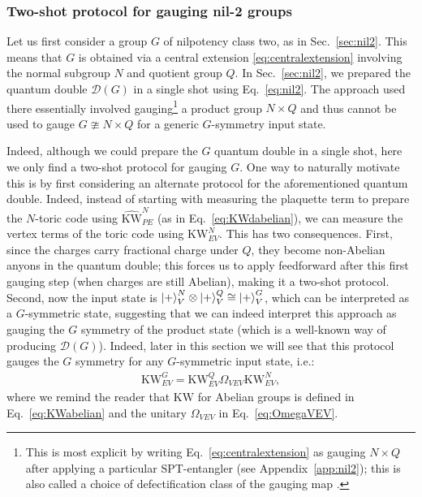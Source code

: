 \documentclass[nofootinbib,prx,twocolumn,showpacs,superscriptaddress,notitlepage,amsmath,amssymb]{revtex4-2}
\theoremstyle{definition}
\def\KW{\text{KW}}
\def\KWd{\widehat{\text{KW}}}
\def\ket#1{\mathinner{|{#1}\rangle}}
\begin{document}
\subsubsection{Two-shot protocol for gauging nil-2 groups}
Let us first consider a group $G$ of nilpotency class two, as in Sec.~\ref{sec:nil2}. This means that $G$ is obtained via a central extension \eqref{eq:centralextension} involving the normal subgroup $N$ and quotient group $Q$. In Sec.~\ref{sec:nil2}, we prepared the quantum double $\mathcal D(G)$ in a single shot using Eq.~\eqref{eq:nil2}. The approach used there essentially involved gauging\footnote{This is most explicit by writing Eq.~\eqref{eq:centralextension} as gauging $N \times Q$ after applying a particular SPT-entangler (see Appendix~\ref{app:nil2}); this is also called a choice of defectification class of the gauging map \cite{BarkeshliBondersonChengWang2019}.} a product group $N \times Q$ and thus cannot be used to gauge $G \ncong N \times Q$ for a generic $G$-symmetry input state.

Indeed, although we could prepare the $G$ quantum double in a single shot, here we only find a two-shot protocol for gauging $G$. One way to naturally motivate this is by first considering an alternate protocol for the aforementioned quantum double. Indeed, instead of starting with measuring the plaquette term to prepare the $N$-toric code using $\KWd^N_{PE}$ (as in Eq.~\eqref{eq:KWdabelian}), we can measure the vertex terms of the toric code using $\KW^N_{EV}$. This has two consequences. First, since the charges carry fractional charge under $Q$, they become non-Abelian anyons in the quantum double; this forces us to apply feedforward after this first gauging step (when charges are still Abelian), making it a two-shot protocol. Second, now the input state is $\ket{+}^N_V \otimes \ket{+}^Q_V \cong \ket{+}^G_V$, which can be interpreted as a $G$-symmetric state, suggesting that we can indeed interpret this approach as gauging the $G$ symmetry of the product state (which is a well-known way of producing $\mathcal D(G)$). Indeed, later in this section we will see that this protocol gauges the $G$ symmetry for any $G$-symmetric input state, i.e.:
\begin{align}
    \KW^G_{EV} = \KW^Q_{EV}  \Omega_{VEV} \KW^N_{EV}, \label{eq:2stepnil2}
\end{align}
where we remind the reader that $\KW$ for Abelian groups is defined in Eq.~\eqref{eq:KWabelian} and the unitary $\Omega_{VEV}$ in Eq.~\eqref{eq:OmegaVEV}.
\end{document}
